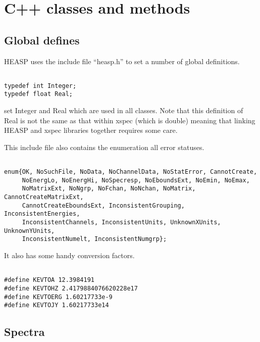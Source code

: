 \documentclass[11pt]{book}
\begin{document}


\chapter{C++ classes and methods}

\section{Global defines}

HEASP uses the include file ``heasp.h'' to set a number of global
definitions.

\begin{verbatim}

typedef int Integer;
typedef float Real;

\end{verbatim}

set Integer and Real which are used in all classes. Note that this
definition of Real is not the same as that within xspec (which is
double) meaning that linking HEASP and xspec libraries together
requires some care.

This include file also contains the enumeration all error statuses.

\begin{verbatim}

enum{OK, NoSuchFile, NoData, NoChannelData, NoStatError, CannotCreate,
     NoEnergLo, NoEnergHi, NoSpecresp, NoEboundsExt, NoEmin, NoEmax,
     NoMatrixExt, NoNgrp, NoFchan, NoNchan, NoMatrix, CannotCreateMatrixExt,
     CannotCreateEboundsExt, InconsistentGrouping, InconsistentEnergies,
     InconsistentChannels, InconsistentUnits, UnknownXUnits, UnknownYUnits,
     InconsistentNumelt, InconsistentNumgrp};

\end{verbatim}

It also has some handy conversion factors.

\begin{verbatim}

#define KEVTOA 12.3984191
#define KEVTOHZ 2.4179884076620228e17
#define KEVTOERG 1.60217733e-9
#define KEVTOJY 1.60217733e14

\end{verbatim}

\section{Spectra}
\end{document}
